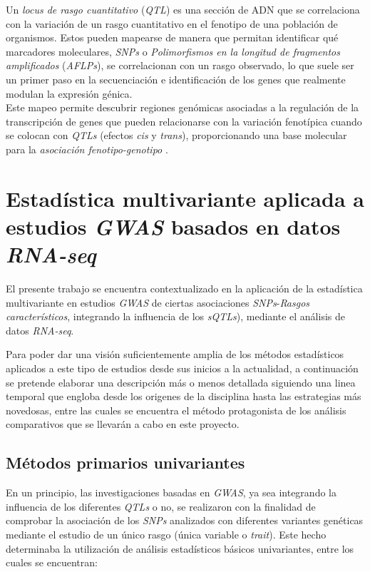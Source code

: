 \documentclass[IB,BIB]{TFUOC}%
\begin{document}
Un \textit{locus de rasgo cuantitativo} (\textit{QTL}) es una sección de ADN que se correlaciona con la variación de un rasgo cuantitativo en el fenotipo de una población de organismos. Estos pueden mapearse de manera que permitan identificar qué marcadores moleculares, \textit{SNPs} o \textit{Polimorfismos en la longitud de fragmentos amplificados} (\textit{AFLPs}), se correlacionan con un rasgo observado, lo que suele ser un primer paso en la secuenciación e identificación de los genes que realmente modulan la expresión génica. \\
Este mapeo permite descubrir regiones genómicas asociadas a la regulación de la transcripción de genes que pueden relacionarse con la variación fenotípica cuando se colocan con \textit{QTLs} (efectos \textit{cis} y \textit{trans}), proporcionando una base molecular para la \textit{asociación fenotipo-genotipo} \cite{noauthor_quantitative_2023, takata_genome-wide_2017, zhang_identification_2015}.


\section{Estadística multivariante aplicada a estudios \textit{GWAS} basados en datos \textit{RNA-seq}}
\label{sec:Estadística multivariante aplicada a estudios GWAS basados en datos RNA-seq}

El presente trabajo se encuentra contextualizado en la aplicación de la estadística multivariante en estudios \textit{GWAS} de ciertas asociaciones \textit{SNPs}-\textit{Rasgos característicos}, integrando la influencia de los \textit{sQTLs}), mediante el análisis de datos \textit{RNA-seq}.

Para poder dar una visión suficientemente amplia de los métodos estadísticos aplicados a este tipo de estudios desde sus inicios a la actualidad, a continuación se pretende elaborar una descripción más o menos detallada siguiendo una linea temporal que engloba desde los origenes de la disciplina hasta las estrategias más novedosas, entre las cuales se encuentra el método protagonista de los análisis comparativos que se llevarán a cabo en este proyecto. 


\subsection{Métodos primarios univariantes}
\label{sec:Métodos primarios univariantes}

En un principio, las investigaciones basadas en \textit{GWAS}, ya sea integrando la influencia de los diferentes \textit{QTLs} o no, se realizaron con la finalidad de comprobar la asociación de los \textit{SNPs} analizados con diferentes variantes genéticas mediante el estudio de un único rasgo (única variable o \textit{trait}). Este hecho determinaba la utilización de análisis estadísticos básicos univariantes, entre los cuales se encuentran:
\end{document}
